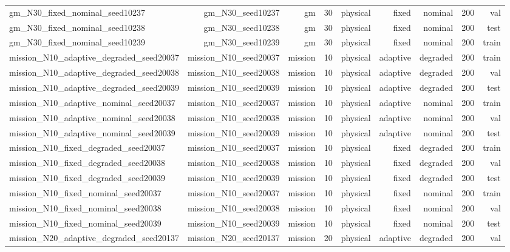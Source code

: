 \begin{tabular}{lrrrrrrrr}
gm\_N30\_fixed\_nominal\_seed10237 & gm\_N30\_seed10237 & gm & 30 & physical & fixed & nominal & 200 & val \\
gm\_N30\_fixed\_nominal\_seed10238 & gm\_N30\_seed10238 & gm & 30 & physical & fixed & nominal & 200 & test \\
gm\_N30\_fixed\_nominal\_seed10239 & gm\_N30\_seed10239 & gm & 30 & physical & fixed & nominal & 200 & train \\
mission\_N10\_adaptive\_degraded\_seed20037 & mission\_N10\_seed20037 & mission & 10 & physical & adaptive & degraded & 200 & train \\
mission\_N10\_adaptive\_degraded\_seed20038 & mission\_N10\_seed20038 & mission & 10 & physical & adaptive & degraded & 200 & val \\
mission\_N10\_adaptive\_degraded\_seed20039 & mission\_N10\_seed20039 & mission & 10 & physical & adaptive & degraded & 200 & test \\
mission\_N10\_adaptive\_nominal\_seed20037 & mission\_N10\_seed20037 & mission & 10 & physical & adaptive & nominal & 200 & train \\
mission\_N10\_adaptive\_nominal\_seed20038 & mission\_N10\_seed20038 & mission & 10 & physical & adaptive & nominal & 200 & val \\
mission\_N10\_adaptive\_nominal\_seed20039 & mission\_N10\_seed20039 & mission & 10 & physical & adaptive & nominal & 200 & test \\
mission\_N10\_fixed\_degraded\_seed20037 & mission\_N10\_seed20037 & mission & 10 & physical & fixed & degraded & 200 & train \\
mission\_N10\_fixed\_degraded\_seed20038 & mission\_N10\_seed20038 & mission & 10 & physical & fixed & degraded & 200 & val \\
mission\_N10\_fixed\_degraded\_seed20039 & mission\_N10\_seed20039 & mission & 10 & physical & fixed & degraded & 200 & test \\
mission\_N10\_fixed\_nominal\_seed20037 & mission\_N10\_seed20037 & mission & 10 & physical & fixed & nominal & 200 & train \\
mission\_N10\_fixed\_nominal\_seed20038 & mission\_N10\_seed20038 & mission & 10 & physical & fixed & nominal & 200 & val \\
mission\_N10\_fixed\_nominal\_seed20039 & mission\_N10\_seed20039 & mission & 10 & physical & fixed & nominal & 200 & test \\
mission\_N20\_adaptive\_degraded\_seed20137 & mission\_N20\_seed20137 & mission & 20 & physical & adaptive & degraded & 200 & val \\

\end{tabular}
